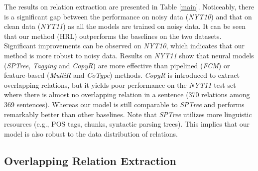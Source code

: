\documentclass[letterpaper]{article} %
\theoremstyle{definition}
\begin{document}
The results on relation extraction are presented in Table \ref{main}. Noticeably, there is a significant gap between the performance on noisy data (\textit{NYT10}) and that on clean data (\textit{NYT11}) as all the models are trained on noisy data. It can be seen that our method (HRL) outperforms the baselines on the two datasets. Significant improvements can be observed on \textit{NYT10}, which indicates that our method is more robust to noisy data. 
Results on \textit{NYT11} show that neural models (\textit{SPTree}, \textit{Tagging} and \textit{CopyR}) are more effective than pipelined (\textit{FCM}) or feature-based (\textit{MultiR} and \textit{CoType}) methods. 
\textit{CopyR} is introduced to extract overlapping relations, but it yields poor performance on the \textit{NYT11} test set where there is almost no overlapping relation in a sentence (370 relations among 369 sentences). Whereas our model is still comparable to \textit{SPTree} and performs remarkably better than other baselines. Note that \textit{SPTree} utilizes more linguistic resources (e.g., POS tags, chunks, syntactic parsing trees). This implies that our model is also robust to the data distribution of relations.

\subsection{Overlapping Relation Extraction}

\end{document}
